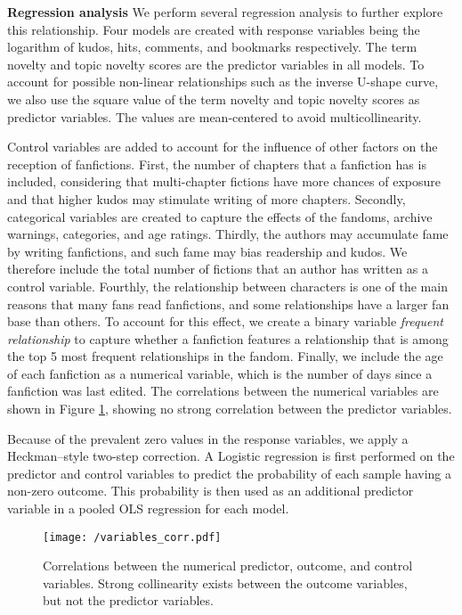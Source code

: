 \documentclass[letterpaper]{article} %
\begin{document}
\textbf{Regression analysis}   We perform several regression analysis to further explore this relationship. Four models are created with response variables being the logarithm of kudos, hits, comments, and bookmarks respectively. The term novelty and topic novelty scores are the predictor variables in all models. To account for possible non-linear relationships such as the inverse U-shape curve, we also use the square value of the term novelty and topic novelty scores as predictor variables. The values are mean-centered to avoid multicollinearity.

Control variables are added to account for the influence of other factors on the reception of fanfictions. First, the number of chapters that a fanfiction has is included, considering that multi-chapter fictions have more chances of exposure and that higher kudos may stimulate writing of more chapters. Secondly, categorical variables are created to capture the effects of the fandoms, archive warnings, categories, and age ratings. Thirdly, the authors may accumulate fame by writing fanfictions, and such fame may bias readership and kudos. We therefore include the total number of fictions that an author has written as a control variable. Fourthly, the relationship between characters is one of the main reasons that many fans read fanfictions, and some relationships have a larger fan base than others. To account for this effect, we create a binary variable \emph{frequent relationship} to capture whether a fanfiction features a relationship that is among the top 5 most frequent relationships in the fandom. Finally, we include the age of each fanfiction as a numerical variable, which is the number of days since a fanfiction was last edited. The correlations between the numerical variables are shown in Figure \ref{fig:corr}, showing no strong correlation between the predictor variables.

Because of the prevalent zero values in the response variables, we apply a Heckman--style two-step correction. A Logistic regression is first performed on the predictor and control variables to predict the probability of each sample having a non-zero outcome. This probability is then used as an additional predictor variable in a pooled OLS regression for each model.

\begin{figure}
    \centering
          \texttt{[image: /variables\_corr.pdf]}
        \caption{Correlations between the numerical predictor, outcome, and control variables. Strong collinearity exists between the outcome variables, but not the predictor variables. }
        \label{fig:corr}
\end{figure}
\end{document}
